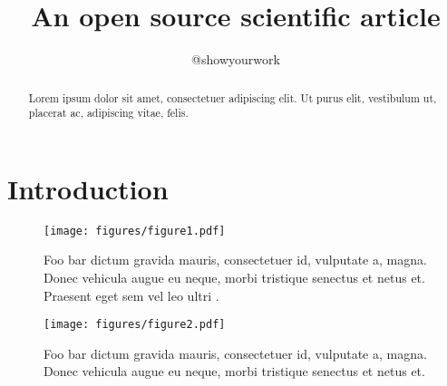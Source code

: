 \documentclass[twocolumn]{aastex631}
\begin{document}
\title{An open source scientific article}

\author{@showyourwork}

\begin{abstract}
    Lorem ipsum dolor sit amet, consectetuer adipiscing elit. 
    Ut purus elit, vestibulum ut, placerat ac, adipiscing vitae, felis.
\end{abstract}

\section{Introduction}
\label{sec:intro}

\begin{figure}
    \texttt{[image: figures/figure1.pdf]}
    \caption{Foo bar dictum gravida mauris, consectetuer id, vulputate a, magna. 
    Donec vehicula augue eu neque, morbi tristique senectus et netus et. 
    Praesent eget sem vel leo ultri \citep{Luger2021}.}
    \label{fig:figure1}
\end{figure}

\begin{figure}
    \texttt{[image: figures/figure2.pdf]}
    \caption{Foo bar dictum gravida mauris, consectetuer id, vulputate a, magna. 
    Donec vehicula augue eu neque, morbi tristique senectus et netus et.}
    \label{fig:figure2}
\end{figure}



\end{document}
